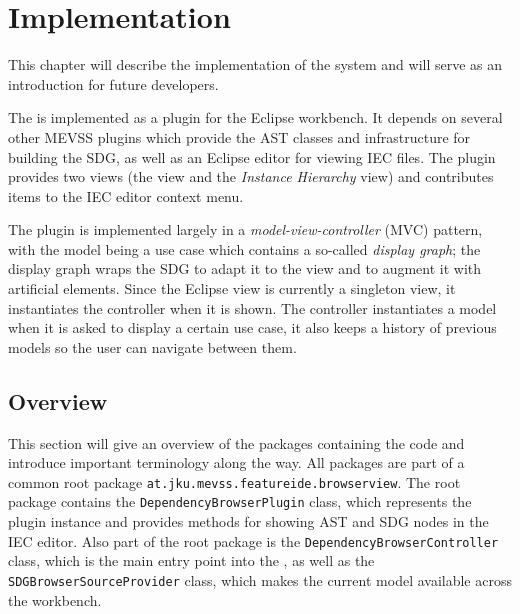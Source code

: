 \chapter{Implementation} \label{ch:impl}

This chapter will describe the implementation of the system and will serve as an introduction for future developers.

The \SB is implemented as a plugin for the Eclipse workbench. It depends on several other MEVSS plugins which provide 
the AST classes and infrastructure for building the SDG, as well as an Eclipse editor for viewing IEC files. The \SB 
plugin provides two views (the \emph{\SB} view and the \emph{Instance Hierarchy} view) and contributes items to the IEC 
editor context menu.

The plugin is implemented largely in a \emph{model-view-controller} (MVC) pattern, with the model being a use case 
which contains a so-called \emph{display graph}; the display graph wraps the SDG to adapt it to the view and to augment 
it with artificial elements. Since the Eclipse view is currently a singleton view, it instantiates the controller when 
it is shown. The controller instantiates a model when it is asked to display a certain use case, it also keeps a 
history of previous models so the user can navigate between them.


\section{Overview}

This section will give an overview of the packages containing the \SB code and introduce important terminology along 
the way. All packages are part of a common root package \lstinline|at.jku.mevss.featureide.browserview|. The root 
package contains the \lstinline|DependencyBrowserPlugin| class, which represents the plugin instance and provides 
methods for showing AST and SDG nodes in the IEC editor. Also part of the root package is the 
\lstinline|DependencyBrowserController| class, which is the main entry point into the \SB, as well as the 
\lstinline|SDGBrowserSourceProvider| class, which makes the current model available across the workbench.

